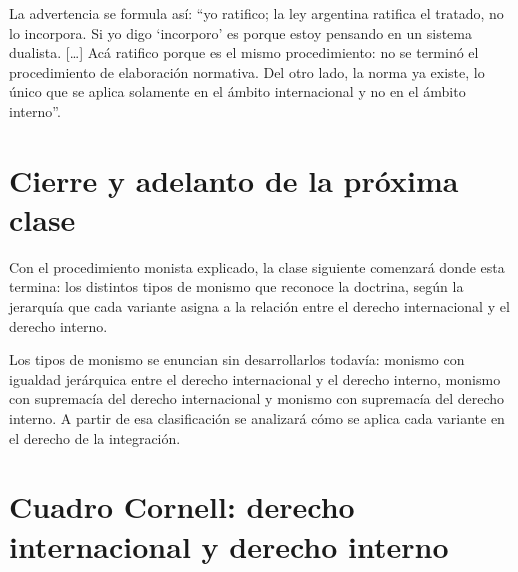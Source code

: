 \documentclass[12pt,oneside]{book}
\begin{document}
La advertencia se formula así: “yo ratifico; la ley argentina ratifica el tratado, no lo incorpora. Si yo digo ‘incorporo’ es porque estoy pensando en un sistema dualista. […] Acá ratifico porque es el mismo procedimiento: no se terminó el procedimiento de elaboración normativa. Del otro lado, la norma ya existe, lo único que se aplica solamente en el ámbito internacional y no en el ámbito interno”.

\section{Cierre y adelanto de la próxima clase}

Con el procedimiento monista explicado, la clase siguiente comenzará donde esta termina: los distintos tipos de monismo que reconoce la doctrina, según la jerarquía que cada variante asigna a la relación entre el derecho internacional y el derecho interno.

\begin{note}
Los tipos de monismo se enuncian sin desarrollarlos todavía: monismo con igualdad jerárquica entre el derecho internacional y el derecho interno, monismo con supremacía del derecho internacional y monismo con supremacía del derecho interno. A partir de esa clasificación se analizará cómo se aplica cada variante en el derecho de la integración.
\end{note}

\section{Cuadro Cornell: derecho internacional y derecho interno}
\end{document}
